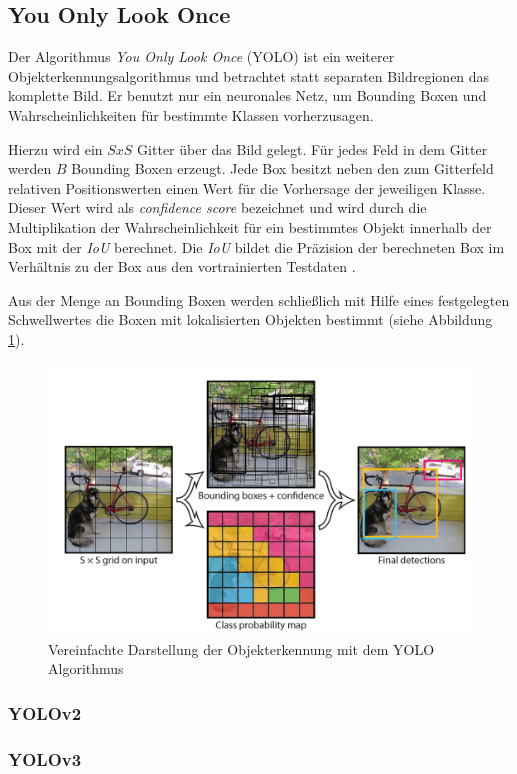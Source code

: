 \subsection{You Only Look Once}

Der Algorithmus \textit{You Only Look Once} (YOLO) ist ein weiterer Objekterkennungsalgorithmus und betrachtet statt separaten Bildregionen das komplette Bild. Er benutzt nur ein neuronales Netz, um Bounding Boxen und Wahrscheinlichkeiten für bestimmte Klassen vorherzusagen.

Hierzu wird ein $S x S$ Gitter über das Bild gelegt. Für jedes Feld in dem Gitter werden $B$ Bounding Boxen erzeugt. Jede Box besitzt neben den zum Gitterfeld relativen Positionswerten einen Wert für die Vorhersage der jeweiligen Klasse. Dieser Wert wird als \textit{confidence score} bezeichnet und wird durch die Multiplikation der Wahrscheinlichkeit für ein bestimmtes Objekt innerhalb der Box mit der \textit{IoU} berechnet. Die \textit{IoU} bildet die Präzision der berechneten Box im Verhältnis zu der Box aus den vortrainierten Testdaten \cite{JosephRedmon.2016}.

Aus der Menge an Bounding Boxen werden schließlich mit Hilfe eines festgelegten Schwellwertes die Boxen mit lokalisierten Objekten bestimmt (siehe Abbildung \ref{yolo_model}).

\begin{figure}[ht]
	\begin{center}
		\includegraphics[width=15cm]{Bilder/yolo_model.png} 
		\caption[Vereinfachte Darstellung der Objekterkennung mit dem YOLO Algorithmus]{Vereinfachte Darstellung der Objekterkennung mit dem YOLO Algorithmus \cite{JosephRedmon.2016}}
		\label{yolo_model}
	\end{center}
\end{figure}

\subsubsection{YOLOv2}

\subsubsection{YOLOv3}




